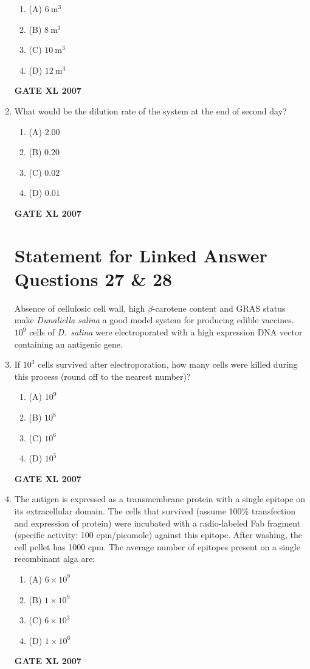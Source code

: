 \documentclass[journal,12pt,onecolumn]{IEEEtran}
\begin{document}
\begin{enumerate}
  \begin{enumerate}
    \item (A) $6\ \text{m}^3$
    \item (B) $8\ \text{m}^3$
    \item (C) $10\ \text{m}^3$
    \item (D) $12\ \text{m}^3$
  \end{enumerate}
	    \hfill \textbf{GATE XL 2007}

  \item What would be the dilution rate of the system at the end of second day?

  \begin{enumerate}
    \item (A) $2.00$
    \item (B) $0.20$
    \item (C) $0.02$
    \item (D) $0.01$
  \end{enumerate}
	    \hfill \textbf{GATE XL 2007}
	\section*{Statement for Linked Answer Questions 27 \& 28}

Absence of cellulosic cell wall, high $\beta$-carotene content and GRAS status make \textit{Dunaliella salina} a good model system for producing edible vaccines. $10^{9}$ cells of \textit{D.~salina} were electroporated with a high expression DNA vector containing an antigenic gene.

    \item If $10^{3}$ cells survived after electroporation, how many cells were killed during this process (round off to the nearest number)?
    \begin{enumerate}
        \item (A) $10^{9}$
        \item (B) $10^{8}$
        \item (C) $10^{6}$
        \item (D) $10^{5}$
    \end{enumerate}
	    \hfill \textbf{GATE XL 2007}

    \item The antigen is expressed as a transmembrane protein with a single epitope on its extracellular domain. The cells that survived (assume 100\% transfection and expression of protein) were incubated with a radio-labeled Fab fragment (specific activity: 100 cpm/picomole) against this epitope. After washing, the cell pellet has 1000 cpm. The average number of epitopes present on a single recombinant alga are:
    \begin{enumerate}
        \item (A) $6 \times 10^{9}$
        \item (B) $1 \times 10^{9}$
        \item (C) $6 \times 10^{3}$
        \item (D) $1 \times 10^{6}$
    \end{enumerate}
	    \hfill \textbf{GATE XL 2007}
\end{enumerate}
\end{document}
